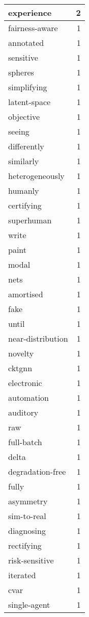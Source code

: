 \begin{table}[h]
\begin{tabular}{|l|r|}
\hline
experience & 2 \\
\hline
fairness-aware & 1 \\
\hline
annotated & 1 \\
\hline
sensitive & 1 \\
\hline
spheres & 1 \\
\hline
simplifying & 1 \\
\hline
latent-space & 1 \\
\hline
objective & 1 \\
\hline
seeing & 1 \\
\hline
differently & 1 \\
\hline
similarly & 1 \\
\hline
heterogeneously & 1 \\
\hline
humanly & 1 \\
\hline
certifying & 1 \\
\hline
superhuman & 1 \\
\hline
write & 1 \\
\hline
paint & 1 \\
\hline
modal & 1 \\
\hline
nets & 1 \\
\hline
amortised & 1 \\
\hline
fake & 1 \\
\hline
until & 1 \\
\hline
near-distribution & 1 \\
\hline
novelty & 1 \\
\hline
cktgnn & 1 \\
\hline
electronic & 1 \\
\hline
automation & 1 \\
\hline
auditory & 1 \\
\hline
raw & 1 \\
\hline
full-batch & 1 \\
\hline
delta & 1 \\
\hline
degradation-free & 1 \\
\hline
fully & 1 \\
\hline
asymmetry & 1 \\
\hline
sim-to-real & 1 \\
\hline
diagnosing & 1 \\
\hline
rectifying & 1 \\
\hline
risk-sensitive & 1 \\
\hline
iterated & 1 \\
\hline
cvar & 1 \\
\hline
single-agent & 1 \\

\end{tabular}
\end{table}
